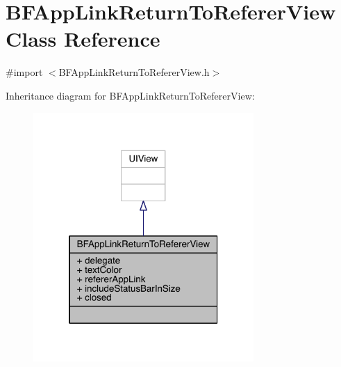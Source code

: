 \hypertarget{interface_b_f_app_link_return_to_referer_view}{\section{B\-F\-App\-Link\-Return\-To\-Referer\-View Class Reference}
\label{interface_b_f_app_link_return_to_referer_view}
}


{\ttfamily \#import $<$B\-F\-App\-Link\-Return\-To\-Referer\-View.\-h$>$}



Inheritance diagram for B\-F\-App\-Link\-Return\-To\-Referer\-View\-:
\nopagebreak
\begin{figure}[H]
\begin{center}
\leavevmode
\includegraphics[width=238pt]{interface_b_f_app_link_return_to_referer_view__inherit__graph}
\end{center}
\end{figure}


